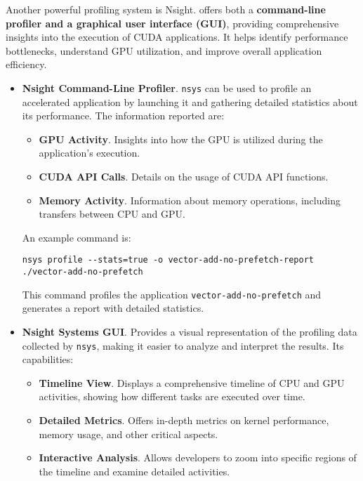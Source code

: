 \highspace
Another powerful profiling system is Nsight.  offers both a \textbf{command-line profiler and a graphical user interface (GUI)}, providing comprehensive insights into the execution of CUDA applications. It helps identify performance bottlenecks, understand GPU utilization, and improve overall application efficiency.
\begin{itemize}
    \item \textbf{Nsight Command-Line Profiler}. \texttt{nsys} can be used to profile an accelerated application by launching it and gathering detailed statistics about its performance. The information reported are:
    \begin{itemize}
        \item \textbf{GPU Activity}. Insights into how the GPU is utilized during the application's execution.
        \item \textbf{CUDA API Calls}. Details on the usage of CUDA API functions.
        \item \textbf{Memory Activity}. Information about memory operations, including transfers between CPU and GPU.
    \end{itemize}
    An example command is:
    \begin{lstlisting}
nsys profile --stats=true -o vector-add-no-prefetch-report ./vector-add-no-prefetch\end{lstlisting}

    This command profiles the application \texttt{vector-add-no-prefetch} and generates a report with detailed statistics.

    \item \textbf{Nsight Systems GUI}. Provides a visual representation of the profiling data collected by \texttt{nsys}, making it easier to analyze and interpret the results. Its capabilities:
    \begin{itemize}
        \item \textbf{Timeline View}. Displays a comprehensive timeline of CPU and GPU activities, showing how different tasks are executed over time.
        \item \textbf{Detailed Metrics}. Offers in-depth metrics on kernel performance, memory usage, and other critical aspects.
        \item \textbf{Interactive Analysis}. Allows developers to zoom into specific regions of the timeline and examine detailed activities.
    \end{itemize}
\end{itemize}
